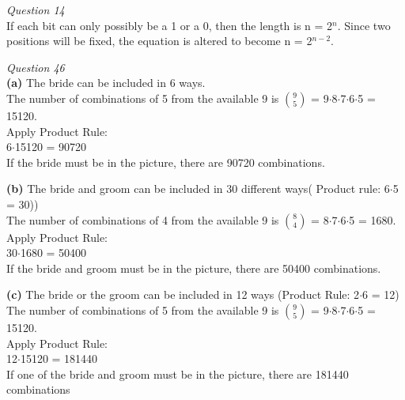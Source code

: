 \documentclass[12pt]{article}
\begin{document}
\begin{flushleft}
\vspace{0.25cm}

\emph{Question 14}\\
If each bit can only possibly be a 1 or a 0, then the length is n = 2\(^{n}\). Since two positions will be fixed, the equation is altered to become n = 2\(^{n-2}\).\\

\vspace{0.25cm}

\emph{Question 46}\\
\textbf{(a)}  The bride can be included in 6 ways.\\
The number of combinations of 5 from the available 9 is \(\binom{9}{5}\) = 9\(\cdot\)8\(\cdot\)7\(\cdot\)6\(\cdot\)5 = 15120. \\
Apply Product Rule:\\
6\(\cdot\)15120 = 90720\\
If the bride must be in the picture, there are 90720 combinations.\\

\vspace{0.25cm}

\textbf{(b)}  The bride and groom can be included in 30 different ways( Product rule: 6\(\cdot\)5 = 30))\\
The number of combinations of 4 from the available 9 is \(\binom{8}{4}\) = 8\(\cdot\)7\(\cdot\)6\(\cdot\)5 = 1680.\\
Apply Product Rule:\\
30\(\cdot\)1680 = 50400\\
If the bride and groom must be in the picture, there are 50400 combinations.\\

\vspace{0.25cm}

\textbf{(c)}  The bride or the groom can be included in 12 ways (Product Rule: 2\(\cdot\)6 = 12)\\
The number of combinations of 5 from the available 9 is \(\binom{9}{5}\) = 9\(\cdot\)8\(\cdot\)7\(\cdot\)6\(\cdot\)5 = 15120.\\
Apply Product Rule:\\
12\(\cdot\)15120 = 181440\\
If one of the bride and groom must be in the picture, there are 181440 combinations
\end{flushleft}
\end{document}
